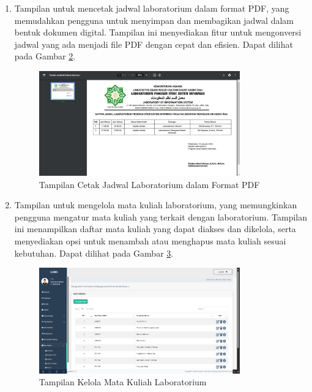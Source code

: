\begin{enumerate}
\begin{figure}
		      \label{fig:edit-jadwal}
	      \end{figure}
	\item Tampilan untuk mencetak jadwal laboratorium dalam format PDF, yang memudahkan pengguna untuk menyimpan dan membagikan jadwal dalam bentuk dokumen digital. Tampilan ini menyediakan fitur untuk mengonversi jadwal yang ada menjadi file PDF dengan cepat dan efisien. Dapat dilihat pada Gambar \ref{fig:cetak-jadwal}.
	      \begin{figure}
		      \centering
		      \includegraphics[width=0.82\textwidth]{konten/gambar/hasil/cetak-jadwal.png}
		      \caption{Tampilan Cetak Jadwal Laboratorium dalam Format PDF}
		      \label{fig:cetak-jadwal}
	      \end{figure}
	\item Tampilan untuk mengelola mata kuliah laboratorium, yang memungkinkan pengguna mengatur mata kuliah yang terkait dengan laboratorium. Tampilan ini menampilkan daftar mata kuliah yang dapat diakses dan dikelola, serta menyediakan opsi untuk menambah atau menghapus mata kuliah sesuai kebutuhan. Dapat dilihat pada Gambar \ref{fig:matkul}.
	      \begin{figure}
		      \centering
		      \includegraphics[width=0.82\textwidth]{konten/gambar/hasil/matkul.png}
		      \caption{Tampilan Kelola Mata Kuliah Laboratorium}
		      \label{fig:matkul}
	      \end{figure}

\end{enumerate}
